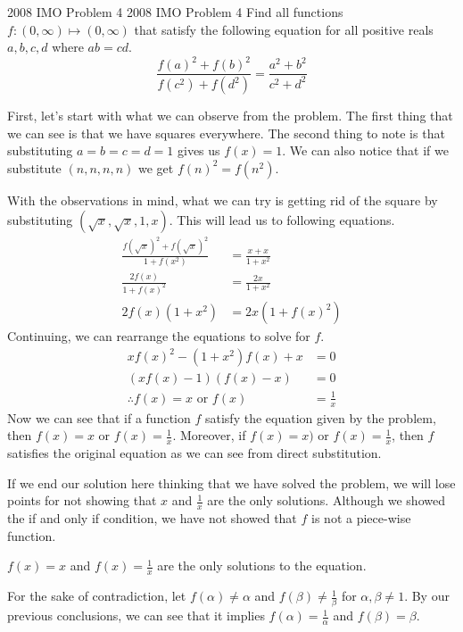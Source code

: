 \documentclass[../../main.tex]{subfiles}
\begin{document}
\begin{problem}{2008 IMO Problem 4 \hard}{2008 IMO Problem 4}
Find all functions $f: (0, \infty) \mapsto (0, \infty)$ that satisfy
the following equation for all positive reals $a, b, c, d$ where
$ab = cd$.
\[
\frac{ f(a)^2 + f(b)^2 }{f(c^2) + f(d^2)}
= \frac{a^2 + b^2}{c^2 + d^2}
\]
\end{problem}
\begin{solution}
First, let's start with what we can observe from the problem.
The first thing that we can see is that we have squares everywhere.
The second thing to note is that substituting $a = b = c = d = 1$
gives us $f(x) = 1$. We can also notice that if we substitute
$(n, n, n, n)$ we get $f(n)^2 = f(n^2)$.

With the observations in mind, what we can try is getting rid of
the square by substituting $(\sqrt{x}, \sqrt{x}, 1, x)$. This
will lead us to following equations.
\begin{align*}
    \frac{ f(\sqrt{x})^2 + f(\sqrt{x})^2 }{ 1 + f(x^2) }
    &= \frac{x + x}{1 + x^2} \\
    \frac{ 2f(x) }{ 1 + f(x)^2 }
    &= \frac{2x}{1 + x^2} \\
    2f(x) (1 + x^2)
    &= 2x(1 + f(x)^2)
\end{align*}
Continuing, we can rearrange the equations to solve for $f$.
\begin{align*}
    xf(x)^2 - (1 + x^2)f(x) + x &= 0 \\
    (xf(x) - 1) (f(x) - x) &= 0 \\
    \therefore
    f(x) = x \text{ or } f(x) &= \frac{1}{x}
\end{align*}
Now we can see that if a function $f$ satisfy the equation given
by the problem, then $f(x) = x$ or $f(x) = \frac{1}{x}$. Moreover,
if $f(x) = x)$ or $f(x) = \frac{1}{x}$, then $f$ satisfies the
original equation as we can see from direct substitution.

If we end our solution here thinking that we have solved the problem,
we will lose points for not showing that $x$ and $\frac{1}{x}$
are the only solutions. Although we showed the if and only if
condition, we have not showed that $f$ is not a piece-wise function.

\begin{lemma*}
$f(x) = x$ and $f(x) = \frac{1}{x}$ are the only solutions to the
equation.
\end{lemma*}
\begin{proofInBox}
For the sake of contradiction, let $f(\alpha) \neq \alpha$ and
$f(\beta) \neq \frac{1}{\beta}$ for $\alpha, \beta \neq 1$.
By our previous conclusions, we can see that it implies
$f(\alpha) = \frac{1}{\alpha}$ and $f(\beta) = \beta$.


\end{proofInBox}
\end{solution}
\end{document}
